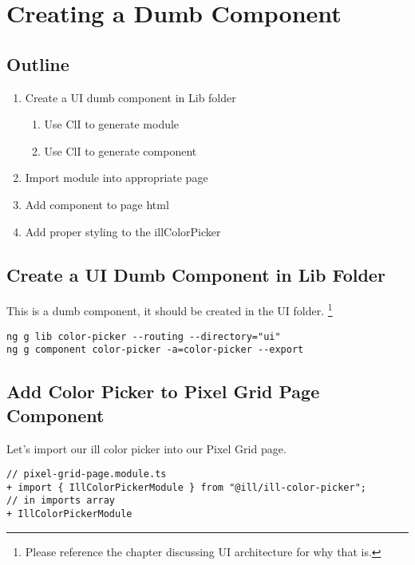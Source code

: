 \maketitle{}
\section{ Creating a Dumb Component }

\subsection {Outline}

\begin{enumerate}
  \item Create a UI dumb component in Lib folder
    \begin{enumerate}
      \item Use ClI to generate module
      \item Use ClI to generate component
    \end{enumerate}
  \item Import module into appropriate page
  \item Add component to page html
  \item Add proper styling to the illColorPicker
\end{enumerate}

\subsection {Create a UI Dumb Component in Lib Folder}
This is a dumb component, it should be created in the UI folder.
\footnote{Please reference the chapter discussing UI architecture for why
that is.}

\begin{lstlisting}
ng g lib color-picker --routing --directory="ui"
ng g component color-picker -a=color-picker --export
\end{lstlisting}

\subsection{ Add Color Picker to Pixel Grid Page Component }
Let's import our ill color picker into our Pixel Grid page.

\begin{lstlisting}
// pixel-grid-page.module.ts
+ import { IllColorPickerModule } from "@ill/ill-color-picker";
// in imports array
+ IllColorPickerModule
\end{lstlisting}

